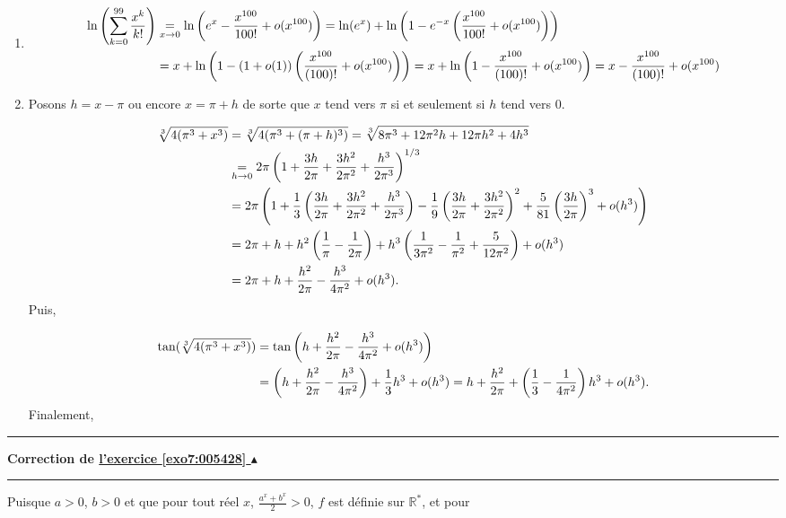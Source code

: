 \documentclass[11pt,a4paper]{article}
\newcommand{\Rr}{\mathbb{R}} \newcommand{\R}{\mathbb{R}}
\newcounter{exo}
\newcommand{\correction}[1]{\hypertarget{cor7:#1}{}\label{cor7:#1}{\bf Correction de \hyperlink{exo7:#1}{l'exercice \ref{exo7:#1} $\blacktriangle$}}\vspace{1mm}\hrule\vspace{1mm}}
\newcommand{\fincorrection}{\vspace{1mm}\hrule\vspace*{7mm}}
\begin{document}
\begin{enumerate}
\begin{center}
\end{center}
\item 
\begin{align*}\ensuremath
\ln\left(\sum_{k=0}^{99}\frac{x^k}{k!}\right)&\underset{x\rightarrow0}{=}\ln\left(e^x-\frac{x^{100}}{100!}+o(x^{100})\right)=\ln(e^x)+\ln\left(1-e^{-x}\left(\frac{x^{100}}{100!}+o(x^{100})\right)\right)\\
 &=x+\ln\left(1-(1+o(1))\left(\frac{x^{100}}{(100)!}+o(x^{100})\right)\right)=x+\ln\left(1-\frac{x^{100}}{(100)!}+o(x^{100})\right)=x-\frac{x^{100}}{(100)!}+o(x^{100})
\end{align*}

\begin{center}
\end{center}
\item Posons $h=x-\pi$ ou encore $x=\pi+h$ de sorte que $x$ tend vers $\pi$ si et seulement si $h$ tend vers $0$.

\begin{align*}\ensuremath
\sqrt[3]{4(\pi^3+x^3)}&=\sqrt[3]{4(\pi^3+(\pi+h)^3)}=\sqrt[3]{8\pi^3+12\pi^2h+12\pi h^2+4h^3}\\
 &\underset{h\rightarrow0}{=}2\pi\left(1+\frac{3h}{2\pi}+\frac{3h^2}{2\pi^2}+\frac{h^3}{2\pi^3}\right)^{1/3}\\
 &=2\pi\left(1+\frac{1}{3}\left(\frac{3h}{2\pi}+\frac{3h^2}{2\pi^2}+\frac{h^3}{2\pi^3}\right)-\frac{1}{9}\left(\frac{3h}{2\pi}+\frac{3h^2}{2\pi^2}\right)^2+\frac{5}{81}\left(\frac{3h}{2\pi}\right)^3+o(h^3)\right)\\
 &=2\pi+h+h^2\left(\frac{1}{\pi}-\frac{1}{2\pi}\right   )+h^3\left(\frac{1}{3\pi^2}-\frac{1}{\pi^2}+\frac{5}{12\pi^2}\right)+o(h^3)\\
 &=2\pi+h+\frac{h^2}{2\pi}-\frac{h^3}{4\pi^2}+o(h^3).
\end{align*}
Puis,

\begin{align*}\ensuremath
\tan(\sqrt[3]{4(\pi^3+x^3)})&=\tan\left(h+\frac{h^2}{2\pi}-\frac{h^3}{4\pi^2}+o(h^3)\right)\\
 &=\left(h+\frac{h^2}{2\pi}-\frac{h^3}{4\pi^2}\right)+\frac{1}{3}h^3+o(h^3)=h+\frac{h^2}{2\pi}+\left(\frac{1}{3}-\frac{1}{4\pi^2}\right)h^3+o(h^3).
\end{align*}
Finalement,

\begin{center}
\end{center}
\end{enumerate}
\fincorrection
\correction{005428}
Puisque $a>0$, $b>0$ et que pour tout réel $x$, $\frac{a^x+b^x}{2}>0$, $f$ est définie sur $\Rr^*$, et pour
\end{document}
